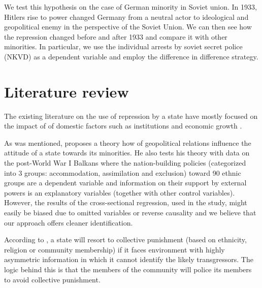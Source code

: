 \documentclass[11pt]{article}
\begin{document}
We test this hypothesis on the case of German minority in Soviet union.
In 1933, Hitlers rise to power changed Germany from a neutral actor to ideological and geopolitical enemy in the perspective of the Soviet Union. We can then see how the repression changed before and after 1933 and compare it with other minorities. In particular, we use the individual arrests by soviet secret police (NKVD) as a dependent variable and employ the difference in difference strategy. 








\section{Literature review}
The existing literature on the use of repression by a state have mostly focused on the impact of  of domestic factors such as institutions and economic growth \citep{davenport_state_2007-1}.

As was mentioned, \citet{mylonas_politics_2013} proposes a theory how of geopolitical relations influence the attitude of a state towards its minorities. He also tests his theory with data on the post-World War I Balkans where the nation-building policies (categorized into 3 groups: accommodation, assimilation and exclusion)  toward  90 ethnic groups are a dependent variable and information on their support by external powers is an explanatory variables (together with other control variables). However, the results of the cross-sectional regression, used in the study, might easily be biased due to omitted variables or reverse causality and we believe that our approach offers cleaner identification.

According to \citet{blaydes_state_2018}, a state will resort to collective punishment (based on ethnicity, religion or community membership) if it faces environment with highly asymmetric information in which it cannot identify the likely transgressors. The logic behind this is that the members of the community will police its members to avoid collective punishment. 
\end{document}
